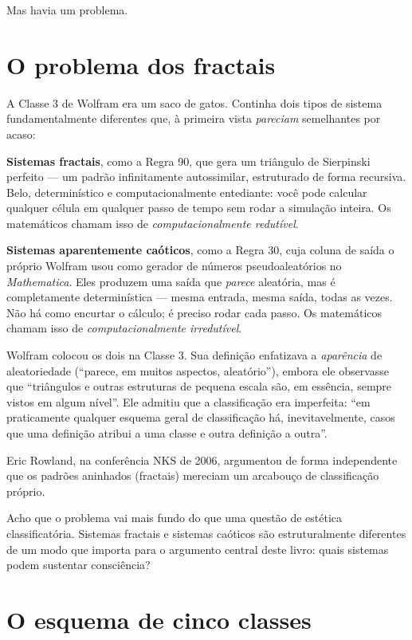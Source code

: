 \documentclass[11pt, twoside, openright]{book}
\begin{document}
Mas havia um problema.

\section*{O problema dos fractais}

A Classe 3 de Wolfram era um saco de gatos. Continha dois tipos de sistema fundamentalmente diferentes que, à primeira vista \textit{pareciam} semelhantes por acaso:

\textbf{Sistemas fractais}, como a Regra 90, que gera um triângulo de Sierpinski perfeito --- um padrão infinitamente autossimilar, estruturado de forma recursiva. Belo, determinístico e computacionalmente entediante: você pode calcular qualquer célula em qualquer passo de tempo sem rodar a simulação inteira. Os matemáticos chamam isso de \textit{computacionalmente redutível}.

\textbf{Sistemas aparentemente caóticos}, como a Regra 30, cuja coluna de saída o próprio Wolfram usou como gerador de números pseudoaleatórios no \textit{Mathematica}. Eles produzem uma saída que \textit{parece} aleatória, mas é completamente determinística --- mesma entrada, mesma saída, todas as vezes. Não há como encurtar o cálculo; é preciso rodar cada passo. Os matemáticos chamam isso de \textit{computacionalmente irredutível}.

Wolfram colocou os dois na Classe 3. Sua definição enfatizava a \textit{aparência} de aleatoriedade (``parece, em muitos aspectos, aleatório''), embora ele observasse que ``triângulos e outras estruturas de pequena escala são, em essência, sempre vistos em algum nível''. Ele admitiu que a classificação era imperfeita: ``em praticamente qualquer esquema geral de classificação há, inevitavelmente, casos que uma definição atribui a uma classe e outra definição a outra''.

Eric Rowland, na conferência NKS de 2006, argumentou de forma independente que os padrões aninhados (fractais) mereciam um arcabouço de classificação próprio.

Acho que o problema vai mais fundo do que uma questão de estética classificatória. Sistemas fractais e sistemas caóticos são estruturalmente diferentes de um modo que importa para o argumento central deste livro: quais sistemas podem sustentar consciência?

\section*{O esquema de cinco classes}
\end{document}

